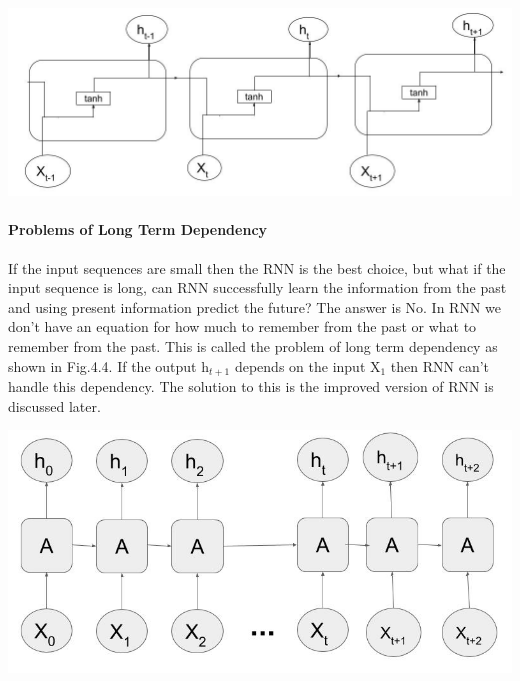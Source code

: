 				\begin{center}
				\includegraphics[width=\linewidth]{figures/The-repeating-module-in-a-standard-RNN.jpg}	
				\label{fig: Unfolded Recurrent layer with activation function}
				\end{center}


\paragraph{Problems of Long Term Dependency}

If the input sequences are small then the RNN is the best choice, but what if the input sequence is long, can RNN successfully learn the information from the past and using present information predict the future? The answer is No. In RNN we don’t have an equation for how much to remember from the past or what to remember from the past. This is called the problem of long term dependency \cite{12} as shown in Fig.4.4. If the output h$_{t+1}$ depends on the input X$_{1}$ then RNN can’t handle this dependency. The solution to this is the improved version of RNN is discussed later.

				\begin{center}
				\includegraphics[width=\linewidth]{figures/Problem-of-Long-Term-Dependency.jpg}	
				\label{fig: Long term dependency problem}
				\end{center}



